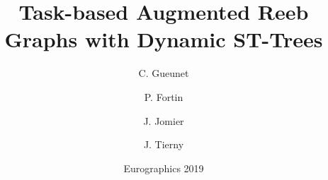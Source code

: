 \documentclass[10pt]{beamer}
\title{Task-based Augmented Reeb Graphs with Dynamic ST-Trees}
\author{C. Gueunet\and P. Fortin \and  J. Jomier \and  J. Tierny}
\date{Eurographics 2019}
\begin{document}
\frame{\titlepage}




\end{document}
